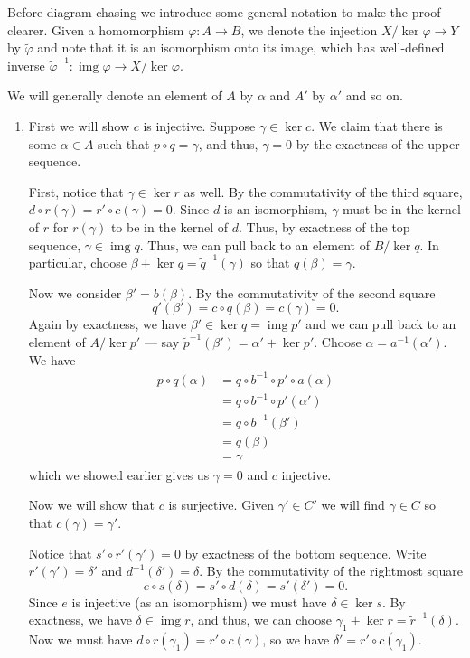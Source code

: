 \documentclass[12 pt, letterpaper]{hmcpset}
\begin{document}
\begin{solution}
	Before diagram chasing we introduce some general notation to make the proof clearer. Given a homomorphism $\varphi : A \to B$, we denote the injection $X / \ker \varphi \to Y$ by $\tilde{\varphi}$ and note that it is an isomorphism onto its image, which has well-defined inverse $\tilde{\varphi}^{-1} : \operatorname{img} \varphi \to X / \ker \varphi$.

	We will generally denote an element of $A$ by $\alpha$ and $A'$ by $\alpha'$ and so on.

	\begin{enumerate}
		\item First we will show $c$ is injective. Suppose $\gamma \in \ker c$. We claim that there is some $\alpha \in A$ such that $p \circ q = \gamma$, and thus, $\gamma = 0$ by the exactness of the upper sequence.

			First, notice that $\gamma \in \ker r$ as well. By the commutativity of the third square, $d \circ r(\gamma) = r' \circ c(\gamma) = 0$. Since $d$ is an isomorphism,  $\gamma$  must be in the kernel of $r$ for $r(\gamma)$ to be in the kernel of $d$. Thus, by exactness of the top sequence, $\gamma \in \operatorname{img} q$. Thus, we can pull back to an element of $B / \ker q$. In particular, choose $\beta + \ker q = \tilde{q}^{-1}(\gamma)$ so that $q(\beta) = \gamma$.

			Now we consider $\beta' = b(\beta)$. By the commutativity of the second square
			\[
				q'(\beta') = c \circ q(\beta) = c(\gamma) = 0.
			\]
			Again by exactness, we have $\beta' \in \ker q = \operatorname{img} p'$ and we can pull back to an element of $A / \ker p'$ --- say $\tilde{p}^{-1}(\beta') = \alpha' + \ker p'$. Choose  $\alpha = a^{-1}(\alpha')$. We have
			\begin{align*}
				p \circ q(\alpha) & = q \circ b^{-1} \circ p' \circ a (\alpha) \\
						  & = q \circ b^{-1} \circ p'(\alpha') \\
						  & = q \circ b^{-1}(\beta') \\
						  & = q(\beta) \\
						  & = \gamma
			\end{align*}
			which we showed earlier gives us $\gamma = 0$ and $c$ injective.

			Now we will show that $c$ is surjective. Given $\gamma' \in C'$ we will find $\gamma \in C$ so that $c(\gamma) = \gamma'$.

			Notice that $s' \circ r' (\gamma') = 0$ by exactness of the bottom sequence. Write $r'(\gamma') = \delta'$ and $d^{-1}(\delta') = \delta$. By the commutativity of the rightmost square
			\[
				e \circ s(\delta) = s' \circ d(\delta) = s'(\delta') = 0.
			\]
			Since $e$ is injective (as an isomorphism) we must have $\delta \in \ker s$. By exactness, we have $\delta \in \operatorname{img} r$, and thus, we can choose $\gamma_{1} + \ker r = \tilde{r}^{-1}(\delta)$. Now we must have $d \circ r(\gamma_{1}) = r' \circ c(\gamma)$, so we have $\delta' = r' \circ c(\gamma_{1})$.


\end{enumerate}
\end{solution}
\end{document}

